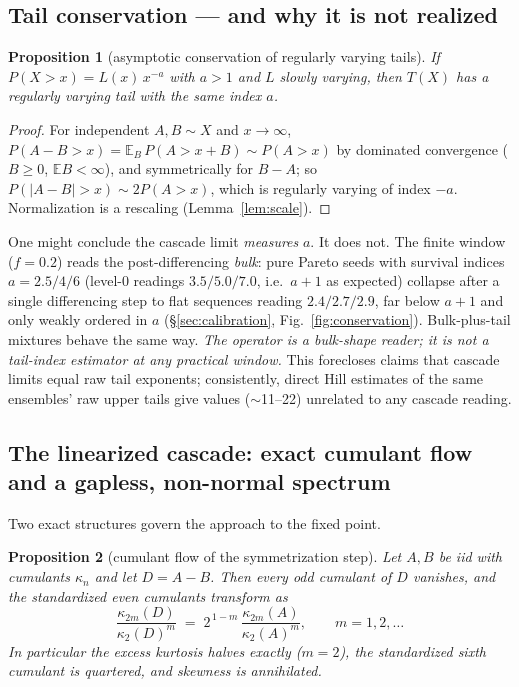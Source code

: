 \documentclass[11pt,a4paper]{article}
\newtheorem{proposition}{Proposition}
\theoremstyle{remark}
\begin{document}
\subsection{Tail conservation --- and why it is not realized}

\begin{proposition}[asymptotic conservation of regularly varying tails]\label{prop:conserve}
If $P(X > x) = L(x)\,x^{-a}$ with $a > 1$ and $L$ slowly varying, then $T(X)$ has a regularly
varying tail with the \emph{same} index $a$.
\end{proposition}

\begin{proof}
For independent $A, B \sim X$ and $x \to \infty$,
$P(A - B > x) = \mathbb{E}_B\,P(A > x + B) \sim P(A > x)$ by dominated convergence
($B \ge 0$, $\mathbb{E}B < \infty$), and symmetrically for $B - A$; so
$P(|A-B| > x) \sim 2 P(A > x)$, which is regularly varying of index $-a$. Normalization is a
rescaling (Lemma~\ref{lem:scale}).
\end{proof}

One might conclude the cascade limit \emph{measures} $a$. It does not. The finite window
($f = 0.2$) reads the post-differencing \emph{bulk}: pure Pareto seeds with survival indices
$a = 2.5 / 4 / 6$ (level-0 readings $3.5 / 5.0 / 7.0$, i.e.\ $a{+}1$ as expected) collapse after a
single differencing step to flat sequences reading $2.4 / 2.7 / 2.9$, far below $a + 1$ and only
weakly ordered in $a$ (\S\ref{sec:calibration}, Fig.~\ref{fig:conservation}). Bulk-plus-tail
mixtures behave the same way. \emph{The operator is a bulk-shape reader; it is not a tail-index
estimator at any practical window.} This forecloses claims that cascade limits equal raw tail
exponents; consistently, direct Hill estimates of the same ensembles' raw upper tails give values
($\sim$11--22) unrelated to any cascade reading.

\subsection{The linearized cascade: exact cumulant flow and a gapless, non-normal
spectrum}\label{sec:linear}

Two exact structures govern the approach to the fixed point.

\begin{proposition}[cumulant flow of the symmetrization step]\label{prop:cumulant}
Let $A, B$ be iid with cumulants $\kappa_n$ and let $D = A - B$. Then every odd cumulant of $D$
vanishes, and the standardized even cumulants transform as
\begin{equation}
\frac{\kappa_{2m}(D)}{\kappa_2(D)^{m}} \;=\; 2^{\,1-m}\,
\frac{\kappa_{2m}(A)}{\kappa_2(A)^{m}},
\qquad m = 1, 2, \dots
\end{equation}
In particular the excess kurtosis \emph{halves} exactly ($m=2$), the standardized sixth cumulant is
quartered, and skewness is annihilated.
\end{proposition}
\end{document}
